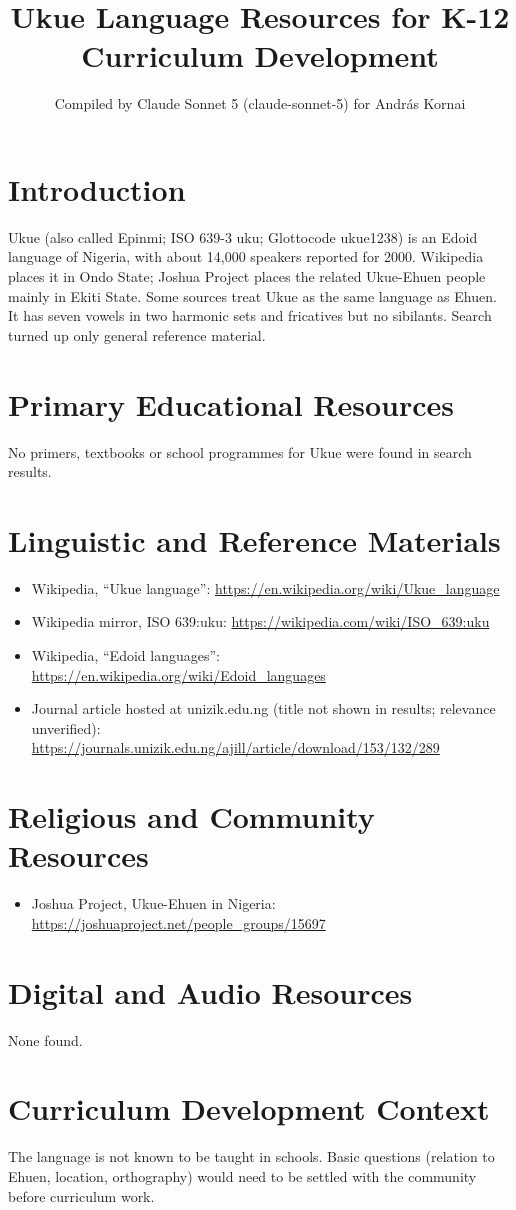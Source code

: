 \documentclass[12pt]{article}
\title{Ukue Language Resources for K-12 Curriculum Development}
\author{Compiled by Claude Sonnet 5 (claude-sonnet-5) for Andr\'as Kornai}
\date{}
\begin{document}
\maketitle

\section{Introduction}
Ukue (also called Epinmi; ISO 639-3 uku; Glottocode ukue1238) is an Edoid language of Nigeria, with about 14,000 speakers reported for 2000. Wikipedia places it in Ondo State; Joshua Project places the related Ukue-Ehuen people mainly in Ekiti State. Some sources treat Ukue as the same language as Ehuen. It has seven vowels in two harmonic sets and fricatives but no sibilants. Search turned up only general reference material.

\section{Primary Educational Resources}
No primers, textbooks or school programmes for Ukue were found in search results.

\section{Linguistic and Reference Materials}
\begin{itemize}
\item Wikipedia, ``Ukue language'': \url{https://en.wikipedia.org/wiki/Ukue_language}
\item Wikipedia mirror, ISO 639:uku: \url{https://wikipedia.com/wiki/ISO_639:uku}
\item Wikipedia, ``Edoid languages'': \url{https://en.wikipedia.org/wiki/Edoid_languages}
\item Journal article hosted at unizik.edu.ng (title not shown in results; relevance unverified): \url{https://journals.unizik.edu.ng/ajill/article/download/153/132/289}
\end{itemize}

\section{Religious and Community Resources}
\begin{itemize}
\item Joshua Project, Ukue-Ehuen in Nigeria: \url{https://joshuaproject.net/people_groups/15697}
\end{itemize}

\section{Digital and Audio Resources}
None found.

\section{Curriculum Development Context}
The language is not known to be taught in schools. Basic questions (relation to Ehuen, location, orthography) would need to be settled with the community before curriculum work.
\end{document}
